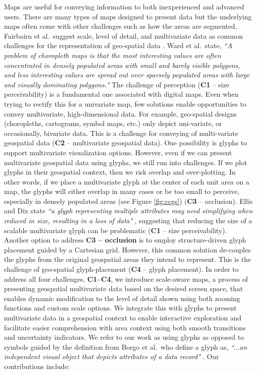 Maps are useful for conveying information to both inexperienced and advanced users. There are many types of maps designed to present data but the underlying maps often come with other challenges such as how the areas are segmented. Fairbairn et al.\ suggest scale, level of detail, and multivariate data as common challenges for the representation of geo-spatial data \cite{fairbairn2001representation}.  Ward et al.\ state, \emph{``A problem of choropleth maps is that the most interesting values are often concentrated in densely populated areas with small and barely visible polygons, and less interesting values are spread out over sparsely populated areas with large and visually dominating polygons."} The challenge of perception (\textbf{C1} -- size perceivability) is a fundamental one associated with digital maps. Even when trying to rectify this for a univariate map, few solutions enable opportunities to convey multivariate, high-dimensional data. For example, geo-spatial designs (choropleths, cartograms, symbol maps, etc.) only depict uni-variate, or occasionally, bivariate data. This is a challenge for conveying of multi-variate geospatial data (\textbf{C2} -- multivariate geospatial data). One possibility is glyphs to support multivariate visualization options. However, even if we can present multivariate geospatial data using glyphs, we still run into challenges. If we plot glyphs in their geospatial context, then we risk overlap and over-plotting. In other words, if we place a multivariate glyph at the center of each unit area on a map, the glyphs will either overlap in many cases or be too small to perceive, especially in densely populated areas (see Figure \ref{fig:ccgs}) (\textbf{C3} -- occlusion). Ellis and Dix state \emph{``a glyph representing multiple attributes may need simplifying when reduced in size, resulting in a loss of data"} \cite{ellis2007taxonomy}, suggesting that reducing the size of a scalable multivariate glyph can be problematic (\textbf{C1} -- size perceivability). Another option to address \textbf{\textbf{C3} -- occlusion} is to employ structure-driven glyph placement guided by a Cartesian grid. However, this common solution de-couples the glyphs from the original geospatial areas they intend to represent. This is the challenge of geo-spatial glyph-placement (\textbf{C4} -- glyph placement).
In order to address all four challenges, \textbf{C1--C4}, we introduce scale-aware maps, a process of presenting geospatial multivariate data based on the desired screen space,  that enables dynamic modification to the level of detail shown using both zooming functions and custom scale options. We integrate this with glyphs to present multivariate data in a geospatial context to enable interactive exploration and facilitate easier comprehension with area context using both smooth transitions and uncertainty indicators. We refer to our work as using glyphs as opposed to symbols guided by the definition from Borgo et al.\ who define a glyph as, \emph{``...an independent visual object that depicts attributes of a data record"} \cite{borgo2013glyph}. Our contributions include:
